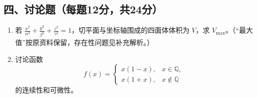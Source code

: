 \documentclass[11pt,fontset=fandol]{ctexart}
\begin{document}
\subsection{四、讨论题（每题12分，共24分）}\label{ux56dbux8ba8ux8bbaux9898ux6bcfux989812ux5206ux517124ux5206}

\begin{enumerate}
\def\labelenumi{\arabic{enumi}.}
\item
  若
  \(\displaystyle\frac{x^2}{\alpha^2}+\frac{y^2}{\beta^2}+\frac{z^2}{\gamma^2}=1\)，切平面与坐标轴围成的四面体体积为
  \(V\)，求
  \(V_{\max}\)。（``最大值''按原资料保留，存在性问题见补充解析。）
\item
  讨论函数 \[
  f(x)=\begin{cases}x(1-x),&x\in\mathbb Q,\\x(1+x),&x\notin\mathbb Q\end{cases}
  \] 的连续性和可微性。
\end{enumerate}
\end{document}
